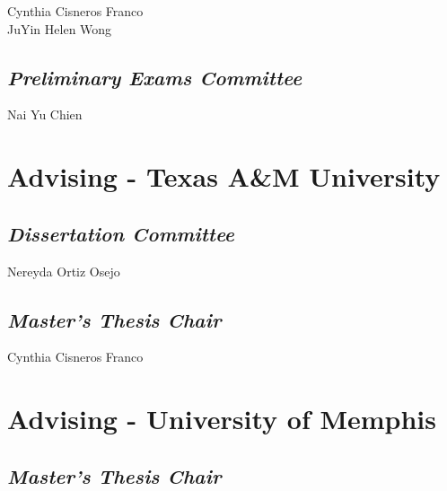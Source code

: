 \documentclass[11pt,]{article}
\begin{document}
Cynthia Cisneros Franco\\
JuYin Helen Wong

\setlength{\leftskip}{0cm}

\subsection{\texorpdfstring{\emph{Preliminary Exams
Committee}}{Preliminary Exams Committee}}\label{preliminary-exams-committee}

\setlength{\leftskip}{1cm}

Nai Yu Chien

\setlength{\leftskip}{0cm}

\section{Advising - Texas A\&M
University}\label{advising---texas-am-university-1}

\subsection{\texorpdfstring{\emph{Dissertation
Committee}}{Dissertation Committee}}\label{dissertation-committee-1}

\setlength{\leftskip}{1cm}

Nereyda Ortiz Osejo

\setlength{\leftskip}{0cm}

\subsection{\texorpdfstring{\emph{Master's Thesis
Chair}}{Master's Thesis Chair}}\label{masters-thesis-chair}

\setlength{\leftskip}{1cm}

Cynthia Cisneros Franco

\setlength{\leftskip}{0cm}

\section{Advising - University of
Memphis}\label{advising---university-of-memphis}

\subsection{\texorpdfstring{\emph{Master's Thesis
Chair}}{Master's Thesis Chair}}\label{masters-thesis-chair-1}
\end{document}
